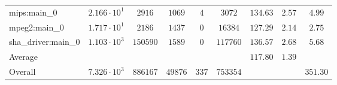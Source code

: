 \begin{tabular}{|l|c|c|c|c|c|c|c|c|}
mips:main\_0            & $ 2.166 \cdot 10^{1} $ & $ 2916   $ & $ 1069  $ & $ 4   $ & $ 3072   $ & $ 134.63      $ & $ 2.57    $ & $ 4.99    $ \\
mpeg2:main\_0           & $ 1.717 \cdot 10^{1} $ & $ 2186   $ & $ 1437  $ & $ 0   $ & $ 16384  $ & $ 127.29      $ & $ 2.14    $ & $ 2.75    $ \\
sha\_driver:main\_0     & $ 1.103 \cdot 10^{3} $ & $ 150590 $ & $ 1589  $ & $ 0   $ & $ 117760 $ & $ 136.57      $ & $ 2.68    $ & $ 5.68    $ \\
\hline
Average                 & $                    $ & $        $ & $       $ & $     $ & $        $ & $ 117.80      $ & $ 1.39    $ & $         $ \\
\hline
Overall                 & $ 7.326 \cdot 10^{3} $ & $ 886167 $ & $ 49876 $ & $ 337 $ & $ 753354 $ & $             $ & $         $ & $ 351.30  $ \\
\hline
\end{tabular}
